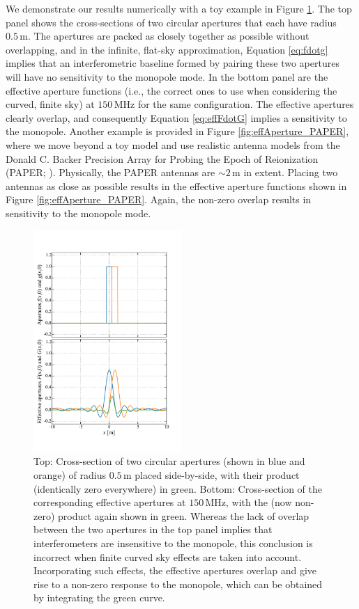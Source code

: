 \documentclass[twocolumn,apj,numberedappendix]{emulateapj}
\begin{document}
We demonstrate our results numerically with a toy example in Figure \ref{fig:effAperture}. The top panel
shows the cross-sections of two circular apertures that each have radius $0.5\,\textrm{m}$. The apertures are packed as
closely together as possible without overlapping, and in the infinite, flat-sky approximation, Equation
\eqref{eq:fdotg} implies that an interferometric baseline formed by pairing these two apertures will
have no sensitivity to the monopole mode. In the bottom panel are the effective aperture functions
(i.e., the correct ones to use when considering the curved, finite sky) at $150\,\textrm{MHz}$ for the same configuration. The effective apertures clearly overlap, and consequently Equation \eqref{eq:effFdotG} implies a sensitivity to the monopole. Another example is provided in Figure \ref{fig:effAperture_PAPER}, where we move beyond a toy model and use realistic antenna models \citep{JonnieBeam} from the Donald C. Backer Precision Array for Probing the Epoch of Reionization (PAPER; \citealt{Parsons2010}). Physically, the PAPER antennas are $\sim 2 \,\textrm{m}$ in extent. Placing two antennas as close as possible results in the effective aperture functions shown in Figure \ref{fig:effAperture_PAPER}. Again, the non-zero overlap results in sensitivity to the monopole mode.

\begin{figure}[h]
	\centering
	\includegraphics[width=0.50\textwidth]{figures/effAperture.pdf}
	\caption{Top: Cross-section of two circular apertures (shown in blue and orange) of radius $0.5\,\textrm{m}$ placed
	side-by-side, with their product (identically zero everywhere) in green. Bottom: Cross-section of the corresponding effective apertures at $150\,\textrm{MHz}$, with the (now non-zero) product again shown in green.
	Whereas the lack of overlap between the two apertures in the top panel implies that
	interferometers are insensitive to the monopole, this conclusion is incorrect when finite
	curved sky effects are taken into account. Incorporating such effects, the effective
	apertures overlap and give rise to a non-zero response to the monopole, which can be obtained by integrating the green curve.}
	\label{fig:effAperture}
\end{figure}
\end{document}
